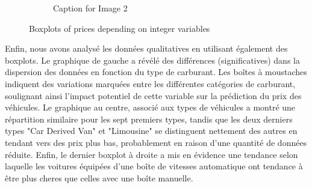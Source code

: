 \documentclass[12pt]{article}
\begin{document}
\begin{figure}[ht]
\begin{subfigure}{0.48\textwidth}
    \caption{Caption for Image 2}
    \label{fig:image2}
  \end{subfigure}
  \caption{Boxplots of prices depending on integer variables}
  \label{fig:twoimages}
\end{figure}
\FloatBarrier

\noindent Enfin, nous avons analysé les données qualitatives en utilisant également des boxplots. Le graphique de gauche a révélé des différences (significatives) dans la dispersion des données en fonction du type de carburant. Les boîtes à moustaches indiquent des variations marquées entre les différentes catégories de carburant, soulignant ainsi l'impact potentiel de cette variable sur la prédiction du prix des véhicules. 
Le graphique au centre, associé aux types de véhicules a montré une répartition similaire pour les sept premiers types, tandis que les deux derniers types "Car Derived Van" et "Limousine" se distinguent nettement des autres en tendant vers des prix plus bas, probablement en raison d'une quantité de données réduite. 
Enfin, le dernier boxplot à droite a mis en évidence une tendance selon laquelle les voitures équipées d'une boîte de vitesses automatique ont tendance à être plus cheres que celles avec une boîte manuelle.
\end{document}

